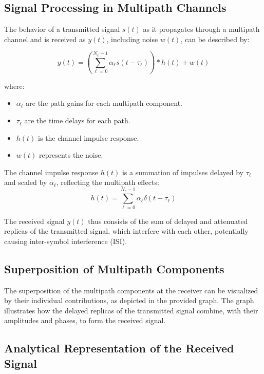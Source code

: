 \subsection*{Signal Processing in Multipath Channels}

The behavior of a transmitted signal \( s(t) \) as it propagates through a multipath channel and is received as \( y(t) \), including noise \( w(t) \), can be described by:

\begin{equation}
    y(t) = \left( \sum_{\ell=0}^{N_c-1} \alpha_{\ell} s(t - \tau_{\ell}) \right) \ast h(t) + w(t)
\end{equation}

where:
\begin{itemize}
    \item \( \alpha_{\ell} \) are the path gains for each multipath component.
    \item \( \tau_{\ell} \) are the time delays for each path.
    \item \( h(t) \) is the channel impulse response.
    \item \( w(t) \) represents the noise.
\end{itemize}

The channel impulse response \( h(t) \) is a summation of impulses delayed by \( \tau_{\ell} \) and scaled by \( \alpha_{\ell} \), reflecting the multipath effects:
\begin{equation}
    h(t) = \sum_{\ell=0}^{N_c-1} \alpha_{\ell} \delta(t - \tau_{\ell})
\end{equation}

The received signal \( y(t) \) thus consists of the sum of delayed and attenuated replicas of the transmitted signal, which interfere with each other, potentially causing inter-symbol interference (ISI).

\subsection*{Superposition of Multipath Components}

The superposition of the multipath components at the receiver can be visualized by their individual contributions, as depicted in the provided graph. The graph illustrates how the delayed replicas of the transmitted signal combine, with their amplitudes and phases, to form the received signal.
\subsection*{Analytical Representation of the Received Signal}

